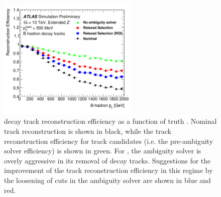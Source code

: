 \begin{figure}[!htbp]
  \centering
  \includegraphics[width=0.6\textwidth]{chapters/3.tracking/figs/b_track_reco_eff.png}
  \caption{
    \bhadron decay track reconstruction efficiency as a function of truth \bhadron \pt \cite{2022DonalTrackReco}.
    Nominal track reconstruction is shown in black, while the track reconstruction efficiency for track candidates (i.e. the pre-ambiguity solver efficiency) is shown in green.
    For \highpt \bhadrons, the ambiguity solver is overly aggressive in its removal of \bhadron decay tracks.
    Suggestions for the improvement of the track reconstruction efficiency in this regime by the loosening of cuts in the ambiguity solver are shown in blue and red.
  }
  \label{fig:b_track_eff}
\end{figure}


